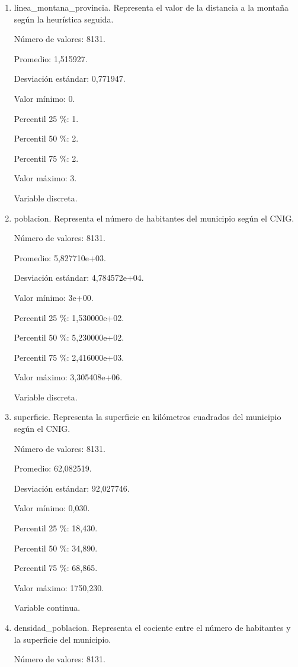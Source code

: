 \begin{enumerate}
	\item linea\_montana\_provincia. Representa el valor de la distancia a la montaña según la heurística seguida.
	
	Número de valores: 8131.
	
	Promedio: 1,515927.
	
	Desviación estándar: 0,771947.
	
	Valor mínimo: 0.
	
	Percentil 25 \%: 1.
	
	Percentil 50 \%: 2.
	
	Percentil 75 \%: 2.
	
	Valor máximo: 3.
	
	Variable discreta.

	\item poblacion. Representa el número de habitantes del municipio según el CNIG.
	
	Número de valores: 8131.
	
	Promedio: 5,827710e+03.
	
	Desviación estándar: 4,784572e+04.
	
	Valor mínimo: 3e+00.
	
	Percentil 25 \%: 1,530000e+02.
	
	Percentil 50 \%: 5,230000e+02.
	
	Percentil 75 \%: 2,416000e+03.
	
	Valor máximo: 3,305408e+06.
	
	Variable discreta.

	\item superficie. Representa la superficie en kilómetros cuadrados del municipio según el CNIG.
	
	Número de valores: 8131.
	
	Promedio: 62,082519.
	
	Desviación estándar: 92,027746.
	
	Valor mínimo: 0,030.
	
	Percentil 25 \%: 18,430.
	
	Percentil 50 \%: 34,890.
	
	Percentil 75 \%: 68,865.
	
	Valor máximo: 1750,230.
	
	Variable continua.

	\item densidad\_poblacion. Representa el cociente entre el número de habitantes y la superficie del municipio.
	
	Número de valores: 8131.
	

\end{enumerate}
